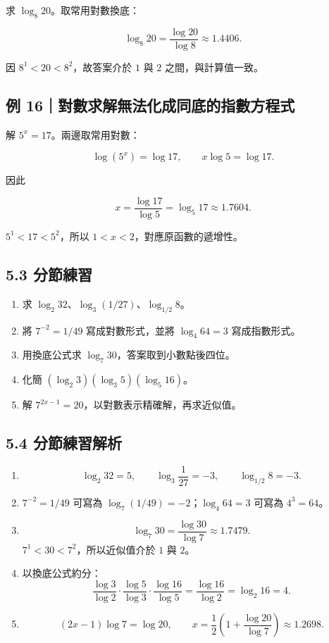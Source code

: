 \documentclass[11pt,a4paper]{article}
\providecommand{\tightlist}{%
  \setlength{\itemsep}{0pt}\setlength{\parskip}{0pt}}
\begin{document}
求 \(\log_8 20\)。取常用對數換底：

\[
\log_8 20=\frac{\log20}{\log8}\approx1.4406.
\]

因 \(8^1<20<8^2\)，故答案介於 \(1\) 與 \(2\) 之間，與計算值一致。

\subsection{例 16｜對數求解無法化成同底的指數方程式}\label{ux4f8b-16ux5c0dux6578ux6c42ux89e3ux7121ux6cd5ux5316ux6210ux540cux5e95ux7684ux6307ux6578ux65b9ux7a0bux5f0f}

解 \(5^x=17\)。兩邊取常用對數：

\[
\log(5^x)=\log17,\qquad x\log5=\log17.
\]

因此

\[
x=\frac{\log17}{\log5}=\log_5 17\approx1.7604.
\]

\(5^1<17<5^2\)，所以 \(1<x<2\)，對應原函數的遞增性。

\subsection{5.3 分節練習}\label{ux5206ux7bc0ux7df4ux7fd2-4}

\begin{enumerate}
\def\labelenumi{\arabic{enumi}.}
\tightlist
\item
  求 \(\log_2 32\)、\(\log_3(1/27)\)、\(\log_{1/2}8\)。
\item
  將 \(7^{-2}=1/49\) 寫成對數形式，並將 \(\log_4 64=3\) 寫成指數形式。
\item
  用換底公式求 \(\log_7 30\)，答案取到小數點後四位。
\item
  化簡 \((\log_2 3)(\log_3 5)(\log_5 16)\)。
\item
  解 \(7^{2x-1}=20\)，以對數表示精確解，再求近似值。
\end{enumerate}

\subsection{5.4 分節練習解析}\label{ux5206ux7bc0ux7df4ux7fd2ux89e3ux6790-4}

\begin{enumerate}
\def\labelenumi{\arabic{enumi}.}
\tightlist
\item
  \[
   \log_2 32=5,\qquad \log_3\frac1{27}=-3,\qquad
   \log_{1/2}8=-3.
   \]
\item
  \(7^{-2}=1/49\) 可寫為 \(\log_7(1/49)=-2\)；\(\log_4 64=3\) 可寫為 \(4^3=64\)。
\item
  \[
   \log_7 30=\frac{\log30}{\log7}\approx1.7479.
   \]
  \(7^1<30<7^2\)，所以近似值介於 \(1\) 與 \(2\)。
\item
  以換底公式約分：
  \[
  \frac{\log3}{\log2}\cdot\frac{\log5}{\log3}\cdot
  \frac{\log16}{\log5}
  =\frac{\log16}{\log2}=\log_2 16=4.
  \]
\item
  \[
   (2x-1)\log7=\log20,\qquad
   x=\frac12\left(1+\frac{\log20}{\log7}\right)\approx1.2698.
   \]
\end{enumerate}
\end{document}
